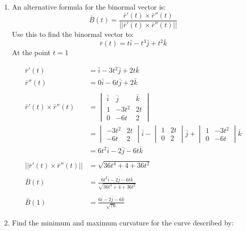 \documentclass[a4paper,11pt]{article}
\begin{document}
\begin{enumerate}
\begin{enumerate}
        \newpage
        \item An alternative formula for the binormal vector is:
        $$ \bar{B}(t) = \frac{\bar{r}'(t) \times \bar{r}''(t)}{|| \bar{r}'(t) \times \bar{r}''(t) ||} $$
        Use this to find the binormal vector to:
        $$ \bar{r}(t) = t\bar{i} -t^3\bar{j} + t^2\bar{k} $$
        At the point $t = 1$

        \begin{align*}
            \bar{r}'(t) &= \bar{i} - 3t^2\bar{j} + 2t\bar{k}\\
            \bar{r}''(t) &= 0\bar{i} - 6t\bar{j} + 2\bar{k}\\\\
            \bar{r}'(t) \times \bar{r}''(t) &=  
            \begin{vmatrix}
                \bar{i} & \bar{j} & \bar{k}\\
                1 & -3t^2 & 2t \\
                0 & -6t & 2
            \end{vmatrix}\\
            &= \begin{vmatrix}
                -3t^2 & 2t \\
                -6t & 2
            \end{vmatrix} \bar{i}
            -\begin{vmatrix}
                1 & 2t\\
                0 & 2
            \end{vmatrix} \bar{j}
            +  \begin{vmatrix}
                1 & -3t^2\\
                0 & -6t
            \end{vmatrix}\bar{k}\\
            &=6t^2\bar{i} - 2\bar{j} - 6t\bar{k} \\\\
            || \bar{r}'(t) \times \bar{r}''(t) || &= \sqrt{36t^4 + 4 + 36t^2}\\\\
            \bar{B}(t) &= \frac{6t^2\bar{i} - 2\bar{j} - 6t\bar{k}}{\sqrt{36t^4 + 4 + 36t^2}}\\\\
            \bar{B}(1) &= \frac{6\bar{i} - 2\bar{j} - 6\bar{k}}{\sqrt{76}}
        \end{align*}
        
        \newpage
        \item Find the minimum and maximum curvature for the curve described by:
        

\end{enumerate}
\end{enumerate}
\end{document}
